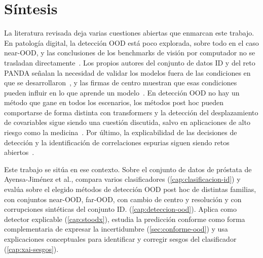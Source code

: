 \section{Síntesis}\label{sec:ea-sintesis}

La literatura revisada deja varias cuestiones abiertas que enmarcan este trabajo.
En patología digital, la detección OOD está poco explorada, sobre todo en el caso
near-OOD, y las conclusiones de los benchmarks de visión por computador no se
trasladan directamente~\cite{linmans2023}. Los propios autores del conjunto de
datos ID y del reto PANDA señalan la necesidad de validar los modelos fuera de las
condiciones en que se desarrollaron~\cite{ayensa2026,bulten2022}, y las firmas de
centro muestran que esas condiciones pueden influir en lo que aprende un
modelo~\cite{howard2021}. En detección OOD no hay un método que gane en todos los
escenarios, los métodos post hoc pueden comportarse de forma distinta con
transformers y la detección del desplazamiento de covariables sigue siendo una
cuestión discutida, salvo en aplicaciones de alto riesgo como la
medicina~\cite{openood15,yang2024}. Por último, la explicabilidad de las
decisiones de detección y la identificación de correlaciones espurias siguen
siendo retos abiertos~\cite{yang2024,sevillano2026,achtibat2023}.

Este trabajo se sitúa en ese contexto. Sobre el conjunto de datos de próstata de
Ayensa-Jiménez et al., compara varios clasificadores (\cref{cap:clasificacion-id})
y evalúa sobre el elegido métodos de detección OOD post hoc de distintas familias,
con conjuntos near-OOD, far-OOD, con cambio de centro y resolución y con corrupciones sintéticas del conjunto ID.
(\cref{cap:deteccion-ood}). Aplica \stoodx como detector explicable
(\cref{cap:stoodx}), estudia la predicción conforme como forma complementaria de
expresar la incertidumbre (\cref{sec:conforme-ood}) y usa explicaciones conceptuales para identificar y
corregir sesgos del clasificador (\cref{cap:xai-sesgos}).

\endinput
